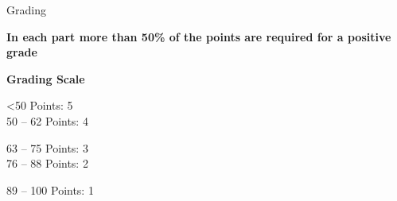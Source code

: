 \documentclass[aspectratio=169]{beamer}
\begin{document}
\begin{frame}{Grading}
    \begin{coloredblock}[blue]
        \centering\footnotesize\textbf{In each part more than 50\% of the points are required for a positive grade}
    \end{coloredblock}

    \vspace{0.5cm}
    \begin{coloredblock}[blue]
        \begin{minipage}[c]{0.24\textwidth}
            \centering\footnotesize \textbf{Grading Scale}
        \end{minipage}
        \hfill
        \begin{minipage}[c]{0.24\textwidth}
            \footnotesize
            <50 Points:         5\\
            50 – 62 Points:     4
        \end{minipage}
        \hfill
        \begin{minipage}[c]{0.24\textwidth}
            \footnotesize
            63 – 75 Points:     3\\
            76 – 88 Points:     2
        \end{minipage}
        \hfill
        \begin{minipage}[t]{0.24\textwidth}
            \footnotesize
            89 – 100 Points:    1
        \end{minipage}
        
    \end{coloredblock}

    
\end{frame}
\end{document}
